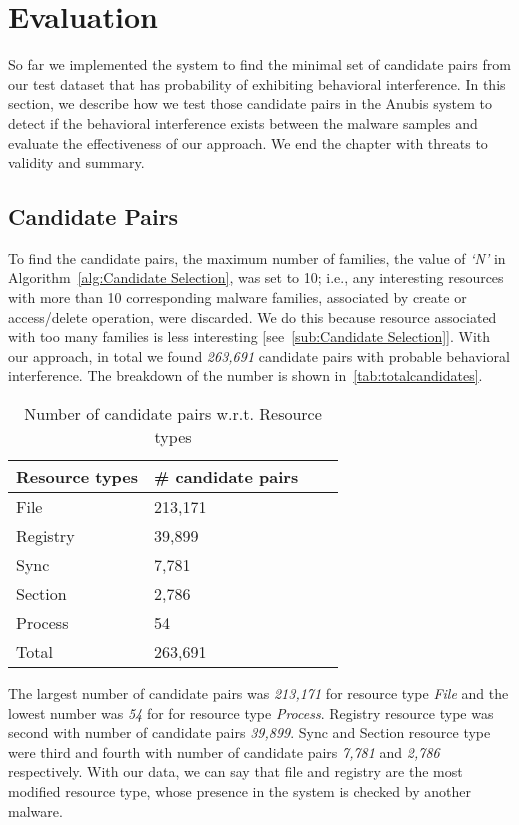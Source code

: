 \chapter{Evaluation}
\label{chapter:evaluation}
So far we implemented the system to find the minimal set of candidate pairs from our test dataset that has probability of exhibiting behavioral interference.
In this section, we describe how we test those candidate pairs in the Anubis system to detect if the behavioral interference exists between the malware samples and evaluate the effectiveness of our approach.
We end the chapter with threats to validity and summary.
\section{Candidate Pairs}
\label{sec:Candidate Pairs}
To find the candidate pairs, the maximum number of families, the value of \emph{`N'} in Algorithm~\autoref{alg:Candidate Selection}, was set to 10;
i.e., any interesting resources with more than 10 corresponding malware families, associated by create or access/delete operation, were discarded.
We do this because resource associated with too many families is less interesting [see~\autoref{sub:Candidate Selection}].
With our approach, in total we found \emph{263,691} candidate pairs with probable behavioral interference.
The breakdown of the number is shown in~\autoref{tab:totalcandidates}.

\begin{table}[ht]
  \caption[Number of probable candidate pairs w.r.t. Resource types]{Number of candidate pairs w.r.t. Resource types}\label{tab:totalcandidates}
  \centering
  \begin{tabular}{l l l l}
    \toprule
    Resource types & \# candidate pairs\\
    \midrule
    File & 213,171 \\
    Registry & 39,899 \\
    Sync & 7,781 \\
    Section & 2,786 \\
    Process & 54\\
    \bottomrule
    Total & 263,691\\
  \end{tabular}
\end{table}
The largest number of candidate pairs was \emph{213,171} for resource type \emph{File} and the lowest number was \emph{54} for for resource type \emph{Process}.
Registry resource type was second with number of candidate pairs \emph{39,899}.
Sync and Section resource type were third and fourth with number of candidate pairs \emph{7,781} and \emph{2,786} respectively.
With our data, we can say that file and registry are the most modified resource type, whose presence in the system is checked by another malware.\\


